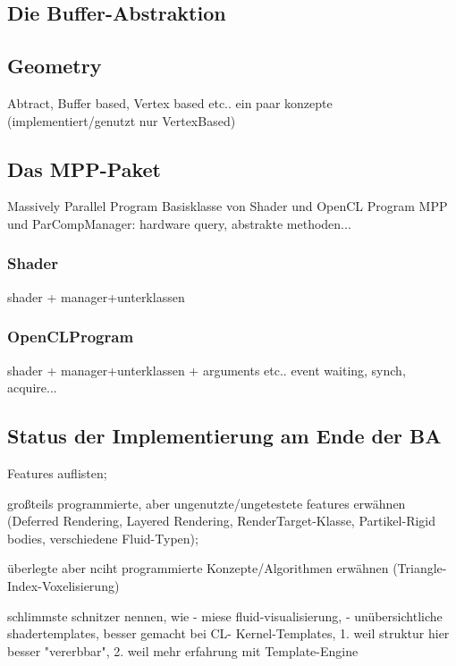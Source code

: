 	

    	
\subsection{Die Buffer-Abstraktion}  
	
		



\subsection{Geometry}
	\label{sec:geometry}
	Abtract, Buffer based, Vertex based etc.. ein paar konzepte (implementiert/genutzt nur VertexBased)  
		


\subsection{Das MPP-Paket}
Massively Parallel Program
	Basisklasse von Shader und OpenCL Program
	MPP und ParCompManager: hardware query, abstrakte methoden...
	\subsubsection{Shader}
		shader + manager+unterklassen
		
	\subsubsection{OpenCLProgram}
		shader + manager+unterklassen + arguments etc.. event waiting, synch, acquire...

\subsection{Status der Implementierung am Ende der BA}
\label{sec:statusImplementation}
	
	Features auflisten;

	großteils programmierte, aber ungenutzte/ungetestete features erwähnen (Deferred Rendering, Layered Rendering, 	
	RenderTarget-Klasse, Partikel-Rigid bodies, verschiedene Fluid-Typen); 


	überlegte aber nciht programmierte Konzepte/Algorithmen erwähnen (Triangle-Index-Voxelisierung)
	
	schlimmste schnitzer nennen, wie
		- miese fluid-visualisierung, 
		- unübersichtliche shadertemplates, besser gemacht bei CL-
			Kernel-Templates, 1. weil struktur hier besser "vererbbar", 2. weil mehr erfahrung mit  Template-Engine
	
	  	
  	

\clearpage

